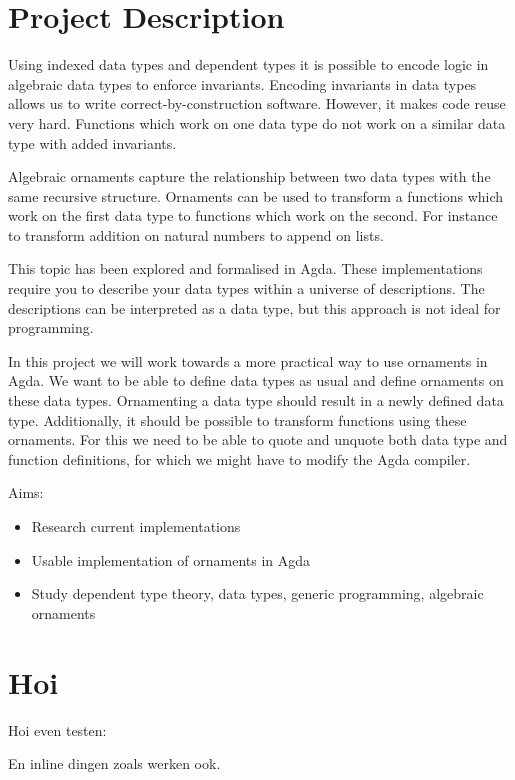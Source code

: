 
\section{Project Description}\label{sec:project-description}

\cite{altenkirch06}
Using indexed data types and dependent types it is possible to encode
logic in algebraic data types to enforce invariants.
Encoding invariants in data types allows us to write correct-by-construction
software.
However, it makes code reuse very hard.
Functions which work on one data type do not work on a similar data
type with added invariants.

Algebraic ornaments capture the relationship between two data types
with the same recursive structure.
Ornaments can be used to transform a functions which work on the first
data type to functions which work on the second.
For instance to transform addition on natural numbers to append on lists.

This topic has been explored and formalised in Agda.
These implementations require you to describe your data types within a
universe of descriptions.
The descriptions can be interpreted as a data type, but this approach is not ideal for programming.

In this project we will work towards a more practical way to use
ornaments in Agda.
We want to be able to define data types as usual and define ornaments
on these data types.
Ornamenting a data type should result in a newly defined data type.
Additionally, it should be possible to transform functions using these
ornaments.
For this we need to be able to quote and unquote both data type and function definitions, for which we might have to modify the Agda compiler.

Aims:

\begin{itemize}
\item Research current implementations
\item Usable implementation of ornaments in Agda
\item Study dependent type theory, data types, generic programming,
algebraic ornaments
\end{itemize}



\section{Hoi}\label{hoi}

Hoi even testen:


En inline dingen zoals  werken ook.

